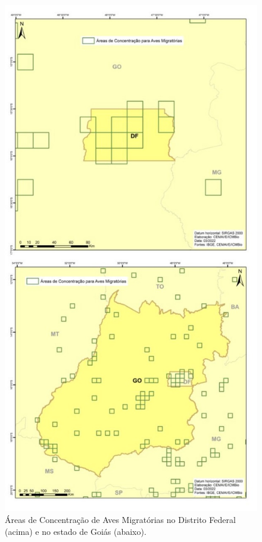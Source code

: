 \documentclass[
  oneside]{scrbook}
\begin{document}
\begin{figure}[H]

{\centering \includegraphics[width=0.7\linewidth]{imagens/cap07/Fig_21_DF_GO} 

}

\caption{Áreas de Concentração de Aves Migratórias no Distrito Federal (acima) e no estado de Goiás (abaixo).}\label{fig:41}
\end{figure}
\end{document}
